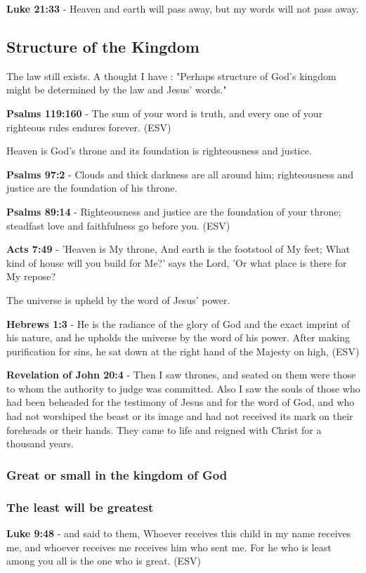 \documentclass[11pt]{article}
\begin{document}
\textbf{Luke 21:33} - Heaven and earth will pass away, but my words will not pass away.

\subsection{Structure of the Kingdom}
\label{sec:org810c0a2}
The law still exists. A thought I have : "Perhaps structure of God's kingdom might be determined by the law and Jesus' words."

\textbf{Psalms 119:160} - The sum of your word is truth, and every one of your righteous rules endures forever. (ESV)

Heaven is God's throne and its foundation is righteousness and justice.

\textbf{Psalms 97:2} - Clouds and thick darkness are all around him; righteousness and justice are the foundation of his throne.

\textbf{Psalms 89:14} - Righteousness and justice are the foundation of your throne; steadfast love and faithfulness go before you. (ESV)

\textbf{Acts 7:49} - 'Heaven is My throne, And earth is the footstool of My feet; What kind of house will you build for Me?' says the Lord, 'Or what place is there for My repose?

The universe is upheld by the word of Jesus' power.

\textbf{Hebrews 1:3} - He is the radiance of the glory of God and the exact imprint of his nature, and he upholds the universe by the word of his power. After making purification for sins, he sat down at the right hand of the Majesty on high, (ESV)

\textbf{Revelation of John 20:4} - Then I saw thrones, and seated on them were those to whom the authority to judge was committed. Also I saw the souls of those who had been beheaded for the testimony of Jesus and for the word of God, and who had not worshiped the beast or its image and had not received its mark on their foreheads or their hands. They came to life and reigned with Christ for a thousand years.

\subsubsection{Great or small in the kingdom of God}
\label{sec:org0be9531}
\subsubsection{The least will be greatest}
\label{sec:org082f42b}
\textbf{Luke 9:48} - and said to them, Whoever receives this child in my name receives me, and whoever receives me receives him who sent me. For he who is least among you all is the one who is great. (ESV)
\end{document}

